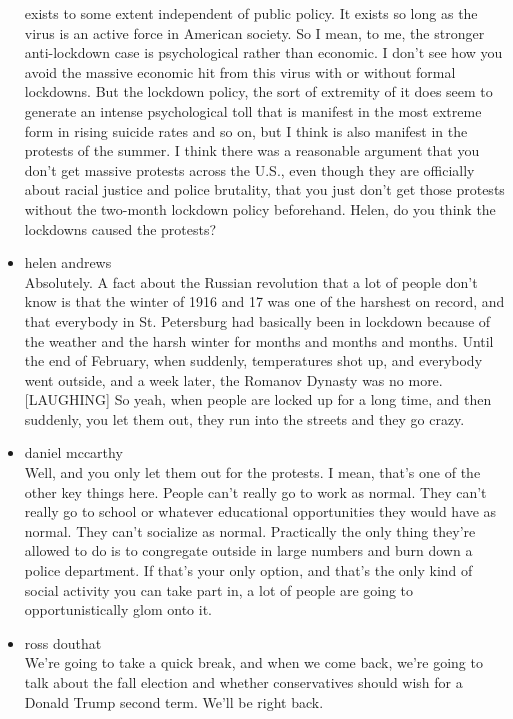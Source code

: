 \begin{itemize}
  exists to some extent independent of public policy. It exists so long
  as the virus is an active force in American society. So I mean, to me,
  the stronger anti-lockdown case is psychological rather than economic.
  I don't see how you avoid the massive economic hit from this virus
  with or without formal lockdowns. But the lockdown policy, the sort of
  extremity of it does seem to generate an intense psychological toll
  that is manifest in the most extreme form in rising suicide rates and
  so on, but I think is also manifest in the protests of the summer. I
  think there was a reasonable argument that you don't get massive
  protests across the U.S., even though they are officially about racial
  justice and police brutality, that you just don't get those protests
  without the two-month lockdown policy beforehand. Helen, do you think
  the lockdowns caused the protests?
\item
  helen andrews\\
  Absolutely. A fact about the Russian revolution that a lot of people
  don't know is that the winter of 1916 and 17 was one of the harshest
  on record, and that everybody in St. Petersburg had basically been in
  lockdown because of the weather and the harsh winter for months and
  months and months. Until the end of February, when suddenly,
  temperatures shot up, and everybody went outside, and a week later,
  the Romanov Dynasty was no more. {[}LAUGHING{]} So yeah, when people
  are locked up for a long time, and then suddenly, you let them out,
  they run into the streets and they go crazy.
\item
  daniel mccarthy\\
  Well, and you only let them out for the protests. I mean, that's one
  of the other key things here. People can't really go to work as
  normal. They can't really go to school or whatever educational
  opportunities they would have as normal. They can't socialize as
  normal. Practically the only thing they're allowed to do is to
  congregate outside in large numbers and burn down a police department.
  If that's your only option, and that's the only kind of social
  activity you can take part in, a lot of people are going to
  opportunistically glom onto it.
\item
  ross douthat\\
  We're going to take a quick break, and when we come back, we're going
  to talk about the fall election and whether conservatives should wish
  for a Donald Trump second term. We'll be right back.


\end{itemize}
